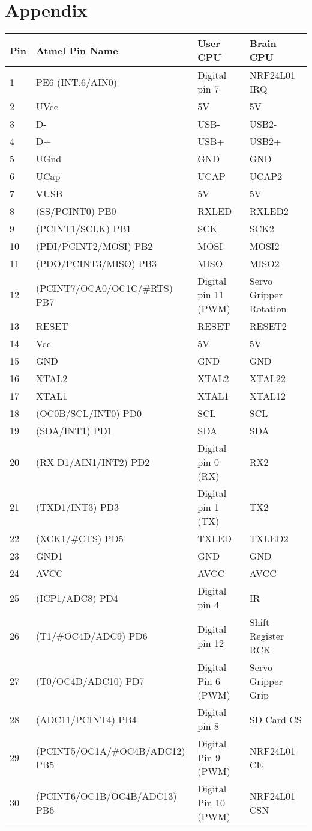 \chapter{Appendix}
\newpage

\begin{longtabu} to \textwidth { X[1,l] X[6,l] X[4,l] X[4,l]}
\toprule
Pin&Atmel Pin Name&User CPU&Brain CPU\\
&PE6 (INT.6/AIN0)&Digital pin 7&NRF24L01 IRQ\\
2&UVcc&5V&5V\\
3&D-&USB-&USB2-\\
4&D+&USB+&USB2+\\
5&UGnd&GND&GND\\
6&UCap&UCAP&UCAP2\\
7&VUSB&5V&5V\\
8&(SS/PCINT0) PB0&RXLED&RXLED2\\
9&(PCINT1/SCLK) PB1&SCK&SCK2\\
10&(PDI/PCINT2/MOSI) PB2&MOSI&MOSI2\\
11&(PDO/PCINT3/MISO) PB3&MISO&MISO2\\
12&(PCINT7/OCA0/OC1C/\#RTS) PB7&Digital pin 11 (PWM)&Servo Gripper Rotation\\
13&RESET&RESET&RESET2\\
14&Vcc&5V&5V\\
15&GND&GND&GND\\
16&XTAL2&XTAL2&XTAL22\\
17&XTAL1&XTAL1&XTAL12\\
18&(OC0B/SCL/INT0) PD0&SCL&SCL\\
19&(SDA/INT1) PD1&SDA&SDA\\
20&(RX D1/AIN1/INT2) PD2&Digital pin 0 (RX)&RX2\\
21&(TXD1/INT3) PD3&Digital pin 1 (TX)&TX2\\
22&(XCK1/\#CTS) PD5&TXLED&TXLED2\\
23&GND1&GND&GND\\
24&AVCC&AVCC&AVCC\\
25&(ICP1/ADC8) PD4&Digital pin 4&IR\\
26&(T1/\#OC4D/ADC9) PD6&Digital pin 12&Shift Register RCK\\
27&(T0/OC4D/ADC10) PD7&Digital Pin 6 (PWM)&Servo Gripper Grip\\
28&(ADC11/PCINT4) PB4&Digital pin 8&SD Card CS\\
29&(PCINT5/OC1A/\#OC4B/ADC12) PB5&Digital Pin 9 (PWM)&NRF24L01 CE\\
30&(PCINT6/OC1B/OC4B/ADC13) PB6&Digital Pin 10 (PWM)&NRF24L01 CSN\\

\end{longtabu}
